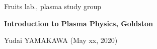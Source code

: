 \documentclass[10pt,dvipdfmx,landscape]{jsarticle}
\begin{document}
%
%
%
\noindent
{\footnotesize
Fruits lab., plasma study group    %
}

\noindent
	\textbf{\Large
		Introduction to Plasma Physics, Goldston    %
	}

	\vspace{1ex}

\noindent
	\textrm{\small 
		Yudai YAMAKAWA (May xx, 2020)    %
	}



\vspace{4ex}


\end{document}
